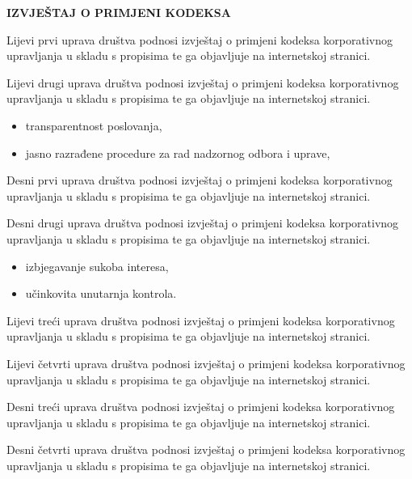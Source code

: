 \documentclass[a4paper,10pt]{article}
\begin{document}
{\Large\bfseries IZVJEŠTAJ O PRIMJENI KODEKSA}

\vspace{1em}
\begin{minipage}[t]{7cm}
Lijevi prvi uprava društva podnosi izvještaj o primjeni kodeksa korporativnog upravljanja u skladu s propisima te ga objavljuje na internetskoj stranici.

Lijevi drugi uprava društva podnosi izvještaj o primjeni kodeksa korporativnog upravljanja u skladu s propisima te ga objavljuje na internetskoj stranici.
\begin{itemize}\setlength{\itemsep}{0pt}
\item transparentnost poslovanja,
\item jasno razrađene procedure za rad nadzornog odbora i uprave,
\end{itemize}
\end{minipage}\hfill
\begin{minipage}[t]{7cm}
\vspace{3.5pt}
Desni prvi uprava društva podnosi izvještaj o primjeni kodeksa korporativnog upravljanja u skladu s propisima te ga objavljuje na internetskoj stranici.

Desni drugi uprava društva podnosi izvještaj o primjeni kodeksa korporativnog upravljanja u skladu s propisima te ga objavljuje na internetskoj stranici.
\begin{itemize}\setlength{\itemsep}{0pt}
\item izbjegavanje sukoba interesa,
\item učinkovita unutarnja kontrola.
\end{itemize}
\end{minipage}

\vspace{1.5em}
\hspace*{-1.2cm}

\vspace{0.5em}
\begin{minipage}[t]{7cm}
Lijevi treći uprava društva podnosi izvještaj o primjeni kodeksa korporativnog upravljanja u skladu s propisima te ga objavljuje na internetskoj stranici.

Lijevi četvrti uprava društva podnosi izvještaj o primjeni kodeksa korporativnog upravljanja u skladu s propisima te ga objavljuje na internetskoj stranici.\end{minipage}\hfill
\begin{minipage}[t]{7cm}
\vspace{3.5pt}
Desni treći uprava društva podnosi izvještaj o primjeni kodeksa korporativnog upravljanja u skladu s propisima te ga objavljuje na internetskoj stranici.

Desni četvrti uprava društva podnosi izvještaj o primjeni kodeksa korporativnog upravljanja u skladu s propisima te ga objavljuje na internetskoj stranici.\end{minipage}
\end{document}
